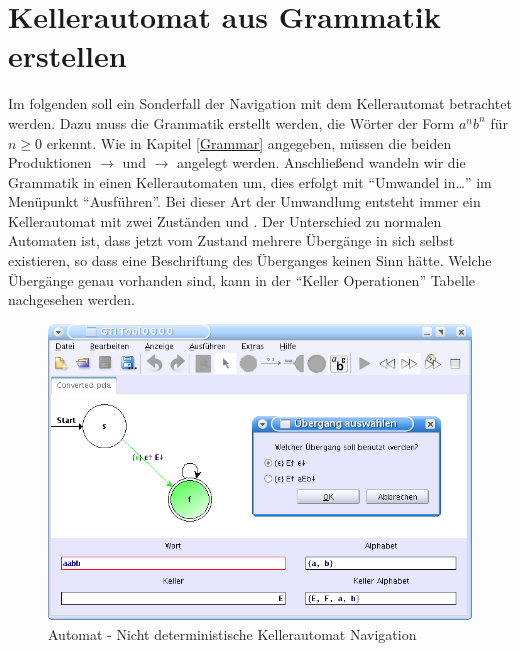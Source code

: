 \section{Kellerautomat aus Grammatik erstellen}

Im folgenden soll ein Sonderfall der Navigation mit dem Kellerautomat betrachtet
werden. Dazu muss die Grammatik erstellt werden, die Wörter der Form $a^n b^n$
für $n \geq 0$ erkennt. Wie in Kapitel \ref{Grammar} angegeben, müssen die beiden
Produktionen  $\to$ \TerminalSymbol{$\epsilon$} und
 $\to$ 
angelegt werden. Anschließend wandeln wir die Grammatik in einen
Kellerautomaten um, dies erfolgt mit "`Umwandel in\ldots"' im Menüpunkt
"`Ausführen"'. Bei dieser Art der Umwandlung entsteht immer ein Kellerautomat
mit zwei Zuständen  und . Der Unterschied zu normalen
Automaten ist, dass jetzt vom Zustand  mehrere Übergänge in sich
selbst existieren, so dass eine Beschriftung des Überganges keinen Sinn hätte.
Welche Übergänge genau vorhanden sind, kann in der "`Keller Operationen"'
Tabelle nachgesehen werden.\vspace{10pt}

\begin{figure}[h]
\begin{center}
\includegraphics[width=12cm]{../images/grammar_pda.png}
\caption{Automat - Nicht deterministische Kellerautomat Navigation}
\end{center}
\end{figure}

